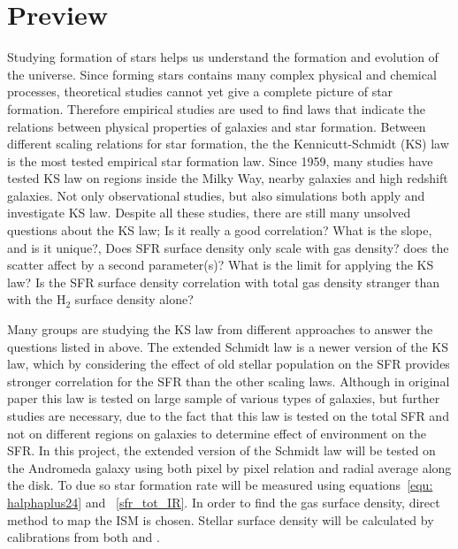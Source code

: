 \section{Preview}
\label{sec: pre_intro}

 Studying formation of stars helps us understand the formation and evolution of the universe. 
 Since forming stars contains many complex physical and chemical processes, theoretical studies cannot yet give a complete picture of star formation.
 Therefore empirical studies are used to find laws that indicate the relations between physical properties of galaxies and star formation.
 Between different scaling relations for star formation, the the Kennicutt-Schmidt (KS) law \citep{Schmidt59, Kennicutt98a} is the most tested empirical star formation law. 
 Since 1959, many studies have tested KS law on regions inside the Milky Way, nearby galaxies and high redshift galaxies.
 Not only observational studies, but also  simulations both apply and investigate KS law. 
 Despite all these studies, there are still many unsolved questions about the KS law; Is it really a good correlation? What is the slope, and is it unique?, Does SFR surface density only scale with gas density? does the scatter affect by a second parameter(s)? What is the limit for applying the KS law? Is the SFR surface density correlation with total gas density stranger than with the H$_2$ surface density alone?

Many groups are studying the KS law from different approaches to answer the questions listed in above. The extended Schmidt law is a newer version of the KS law, which by considering the effect of old stellar population on the SFR provides stronger correlation for the SFR than the other scaling laws. Although in original paper this law is tested on large sample of various types of galaxies, but further studies are necessary, due to the fact that this law is tested on the total SFR and not on different regions on galaxies to determine effect of environment on the SFR. In this project, the extended version of the Schmidt law will be tested on the Andromeda galaxy using both pixel by pixel relation and radial average along the disk. To due so star formation rate will be measured using equations~\ref{equ: halphaplus24} and ~\ref{sfr_tot_IR}. In order to find the gas surface density, direct method to map the ISM is chosen. Stellar surface density will be calculated by calibrations from both \cite{Eskew12} and \cite{Zhu10}.

